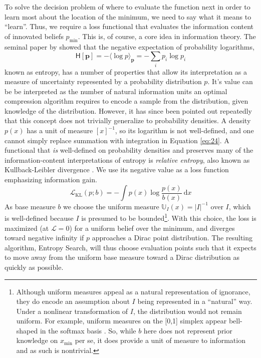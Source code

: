\documentclass[twoside,11pt]{article}
\renewcommand{\L}{\mathcal{L}}
\renewcommand{\d}{\:\mathrm{d}}
\newcommand{\xmin}{x_{\min}}
\newcommand{\pmin}{p_{\min}}
\renewcommand{\vec}{\boldsymbol}
\newcommand{\KL}{\text{KL}}
\begin{document}
To solve the decision problem of where to evaluate the function next
in order to learn most about the location of the minimum, we need to
say what it means to ``learn''. Thus, we require a loss functional
that evaluates the information content of innovated beliefs $\pmin$.
This is, of course, a core idea in information theory. The seminal
paper by \citet{shannon1948mathematical} showed that the negative
expectation of probability logarithms,
\begin{equation}
  \label{eq:24}
  \mathsf{H}[\vec{p}] = -\langle \log p \rangle_{\vec p} = -\sum_i p_i \log p_i
\end{equation}
known as entropy, has a number of properties that allow its
interpretation as a measure of uncertainty represented by a
probability distribution $p$. It's value can be be interpreted as the
number of natural information units an optimal compression algorithm
requires to encode a sample from the distribution, given knowledge of
the distribution. However, it has since been pointed out repeatedly
that this concept does not trivially generalize to probability
densities. A density $p(x)$ has a unit of measure $[x]^{-1}$, so its
logarithm is not well-defined, and one cannot simply replace summation
with integration in Equation \eqref{eq:24}. A functional that
\emph{is} well-defined on probability densities and preserves many of
the information-content interpretations of entropy
\citep{jaynes2003probability} is \emph{relative entropy}, also known
as Kullback-Leibler divergence \citep{kullback1951information}. We use
its negative value as a loss function emphasizing information gain.
\begin{equation}
  \label{eq:25}
  \L_{\KL}(p; b) = -\int p(x) \log\frac{p(x)}{b(x)} \d x
\end{equation}
As base measure $b$ we choose the uniform measure $\mathbb{U}_I
(x)=|I|^{-1}$ over $I$, which is well-defined because $I$ is presumed
to be bounded\footnote{Although uniform measures appeal as a
  natural representation of ignorance, they do encode an assumption
  about $I$ being represented in a ``natural'' way. Under a nonlinear
  transformation of $I$, the distribution would not remain
  uniform. For example, uniform measures on the [0,1] simplex appear
  bell-shaped in the softmax basis \citep{mackay1998choice}. So, while
  $b$ here does not represent prior knowledge on $\xmin$ per se, it
  does provide a unit of measure to information and as such is
  nontrivial.}. With this choice, the loss is maximized (at $\L=0$)
for a uniform belief over the minimum, and diverges toward negative
infinity if $p$ approaches a Dirac point distribution. The resulting
algorithm, Entropy Search, will thus choose evaluation points such
that it expects to move away from the uniform base measure toward a
Dirac distribution as quickly as possible.
\end{document}
